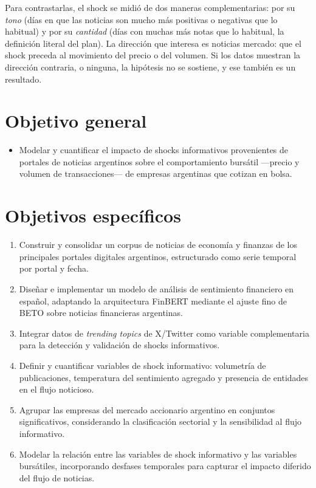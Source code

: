 Para contrastarlas, el shock se midió de dos maneras complementarias: por su \textit{tono}
(días en que las noticias son mucho más positivas o negativas que lo habitual) y por su
\textit{cantidad} (días con muchas más notas que lo habitual, la definición literal del plan).
La dirección que interesa es noticias \flecha{} mercado: que el shock preceda al movimiento
del precio o del volumen. Si los datos muestran la dirección contraria, o ninguna, la
hipótesis no se sostiene, y ese también es un resultado.

\section{Objetivo general}

\begin{itemize}
  \item Modelar y cuantificar el impacto de shocks informativos provenientes de portales de
        noticias argentinos sobre el comportamiento bursátil —precio y volumen de
        transacciones— de empresas argentinas que cotizan en bolsa.
\end{itemize}

\section{Objetivos específicos}

\begin{enumerate}
  \item Construir y consolidar un corpus de noticias de economía y finanzas de los
        principales portales digitales argentinos, estructurado como serie temporal por
        portal y fecha.
  \item Diseñar e implementar un modelo de análisis de sentimiento financiero en español,
        adaptando la arquitectura FinBERT mediante el ajuste fino de BETO sobre noticias
        financieras argentinas.
  \item Integrar datos de \textit{trending topics} de X/Twitter como variable complementaria
        para la detección y validación de shocks informativos.
  \item Definir y cuantificar variables de shock informativo: volumetría de publicaciones,
        temperatura del sentimiento agregado y presencia de entidades en el flujo noticioso.
  \item Agrupar las empresas del mercado accionario argentino en conjuntos significativos,
        considerando la clasificación sectorial y la sensibilidad al flujo informativo.
  \item Modelar la relación entre las variables de shock informativo y las variables
        bursátiles, incorporando desfases temporales para capturar el impacto diferido del
        flujo de noticias.
\end{enumerate}

